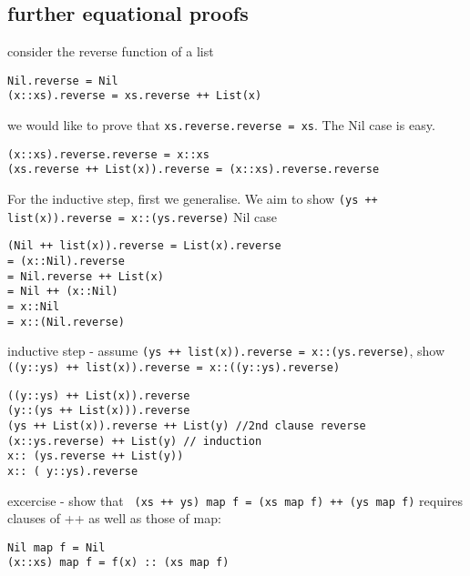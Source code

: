 \subsection{ further equational proofs}

consider the reverse function of a list

\begin{lstlisting}
Nil.reverse = Nil
(x::xs).reverse = xs.reverse ++ List(x)
\end{lstlisting}

we would like to prove that \lstinline|xs.reverse.reverse = xs|. The Nil case is easy. 
\begin{lstlisting}
(x::xs).reverse.reverse = x::xs
(xs.reverse ++ List(x)).reverse = (x::xs).reverse.reverse
\end{lstlisting}

For the inductive step, first we generalise. We aim to show \lstinline|(ys ++ list(x)).reverse = x::(ys.reverse)|
Nil case
\begin{lstlisting}
(Nil ++ list(x)).reverse = List(x).reverse 
= (x::Nil).reverse 
= Nil.reverse ++ List(x)
= Nil ++ (x::Nil)
= x::Nil
= x::(Nil.reverse)
\end{lstlisting}

inductive step - assume \lstinline|(ys ++ list(x)).reverse = x::(ys.reverse)|, show \lstinline|((y::ys) ++ list(x)).reverse = x::((y::ys).reverse)|

\begin{lstlisting}
((y::ys) ++ List(x)).reverse
(y::(ys ++ List(x))).reverse
(ys ++ List(x)).reverse ++ List(y) //2nd clause reverse
(x::ys.reverse) ++ List(y) // induction
x:: (ys.reverse ++ List(y))
x:: ( y::ys).reverse
\end{lstlisting}


excercise - show that \lstinline| (xs ++ ys) map f = (xs map f) ++ (ys map f)|
requires clauses of ++ as well as those of map:
\begin{lstlisting}
Nil map f = Nil
(x::xs) map f = f(x) :: (xs map f)
\end{lstlisting}








